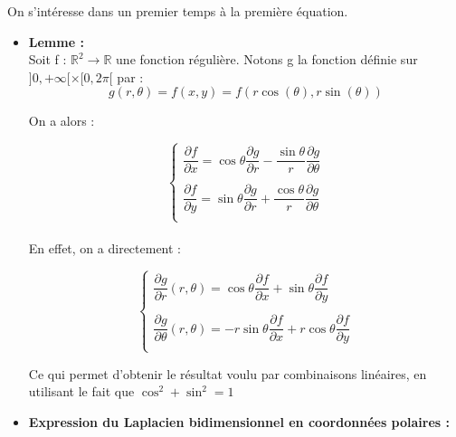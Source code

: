 \documentclass[a4,12pt]{article}
\newcommand{\R}{\mathbb{R}}
\begin{document}
		  On s'intéresse dans un premier temps à la première équation.\\

		  \begin{itemize} 
		    \item \textbf{Lemme :}\\

		    Soit f : $\R^2 \rightarrow \R$ une fonction régulière. Notons g la fonction définie sur $]0,+\infty[ \times [0,2\pi[$ par :
		      \[
			g(r,\theta) = f(x,y) = f(r \cos(\theta), r \sin(\theta))
		      \]

		      On a alors :

		      \begin{equation*}{}
			\left\{
			  \begin{array}{rl}
			    \dfrac{\partial f}{\partial x} = \cos \theta \dfrac{\partial g}{\partial r} - \dfrac{\sin \theta}{r} \dfrac{\partial g}{\partial \theta}\\\\
			    \dfrac{\partial f}{\partial y} = \sin \theta \dfrac{\partial g}{\partial r} + \dfrac{\cos \theta}{r} \dfrac{\partial g}{\partial \theta}\\
			  \end{array}
			  \right.
			\end{equation*}
			~\\
			En effet, on a directement :

			\begin{equation*}{}
			  \left\{
			    \begin{array}{l}
			      \dfrac{\partial g}{\partial r}(r,\theta) = \cos \theta \dfrac{\partial f}{\partial x} + \sin \theta \dfrac{\partial f}{\partial y}\\\\
			      \dfrac{\partial g}{\partial \theta}(r,\theta) = - r \sin \theta \dfrac{\partial f}{\partial x} + r \cos \theta \dfrac{\partial f}{\partial y}\\
			    \end{array}
			    \right.
			  \end{equation*}

			  Ce qui permet d'obtenir le résultat voulu par combinaisons linéaires, en utilisant le fait que $\cos^2 + \sin^2 = 1$ \\

			\item \textbf{Expression du Laplacien bidimensionnel en coordonnées polaires :}
		      \end{itemize}
\end{document}
